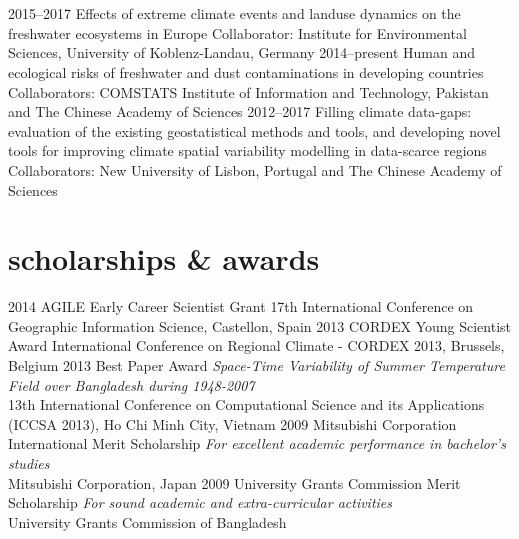 \documentclass[]{friggeri-cv} %
\begin{document}
\section{}
\begin{entrylist}
\entry
{\small{2015--2017}}
{Effects of extreme climate events and landuse dynamics on the freshwater ecosystems in Europe}
{}
{Collaborator: Institute for Environmental Sciences, University of Koblenz-Landau, Germany}
\entry
{\small{2014--present}}
{Human and ecological risks of freshwater and dust contaminations in developing countries}
{}
{Collaborators: COMSTATS Institute of Information and Technology, Pakistan and The Chinese Academy of Sciences}
\entry
{\small{2012--2017}}
{Filling climate data-gaps: evaluation of the existing geostatistical methods and tools, and developing novel tools for improving climate spatial variability modelling in data-scarce regions}
{}
{Collaborators: New University of Lisbon, Portugal and The Chinese Academy of Sciences}
\end{entrylist}

\section{scholarships \& awards}
\begin{entrylist}
\entry
{\small{2014}}
{AGILE Early Career Scientist Grant}
{}
{17th International Conference on Geographic Information Science, Castellon, Spain}
\entry
{\small{2013}}
{CORDEX Young Scientist Award}
{}
{International Conference on Regional Climate - CORDEX 2013, Brussels, Belgium}
\entry
{\small{2013}}
{Best Paper Award}
{}
{{\emph{Space-Time Variability of Summer Temperature Field over Bangladesh during 1948-2007}} \\
13th International Conference on Computational Science and its Applications (ICCSA 2013), Ho Chi Minh City, Vietnam}
\entry
{\small{2009}}
{Mitsubishi Corporation International Merit Scholarship}
{}
{{\emph{For excellent academic performance in bachelor's studies}} \\
Mitsubishi Corporation, Japan}
\entry
{\small{2009}}
{University Grants Commission Merit Scholarship}
{}
{{\emph{For sound academic and extra-curricular activities}} \\
University Grants Commission of Bangladesh}
\end{entrylist}
\end{document}
